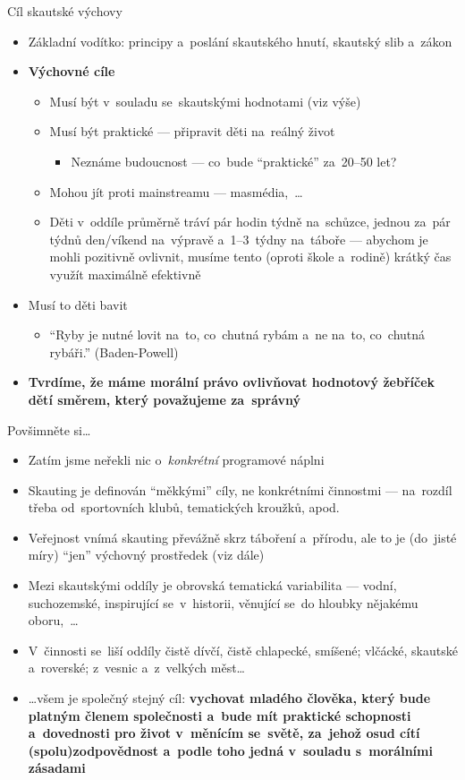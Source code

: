 \documentclass[compress, ucs, xelatex, 11pt, xcolor=dvipsnames, print, aspectratio=169,
	hyperref={
		bookmarks=true,
		unicode=true,
		colorlinks=true,
		pdftitle={Skautska vychovna metoda},
		plainpages=false,
		pdfauthor={Vojtech Zeisek},
		pdfsubject={Skautska vychovna metoda a jeji vyvoj za posledni stoleti a desetileti},
		pdfcreator={XeLaTeX},
		pdfkeywords={Junak, Pedagogika, Skaut, Skauting, Vychovna metoda},
		linkcolor=Red, %
		anchorcolor=ForestGreen, %
		citecolor=ForestGreen, %
		filecolor=ForestGreen, %
		menucolor=ForestGreen, %
		urlcolor=Sepia, %
		pdftex},
	url={hyphens, lowtilde} %
	]{beamer}
\begin{document}
\begin{frame}{Cíl skautské výchovy}
	\begin{itemize}
		\item Základní vodítko: principy a~poslání skautského hnutí, skautský slib a~zákon
		\item \textbf{Výchovné cíle}
		\begin{itemize}
			\item Musí být v~souladu se~skautskými hodnotami (viz výše)
			\item Musí být praktické --- připravit děti na~reálný život
			\begin{itemize}
		\item Neznáme budoucnost --- co~bude \enquote{praktické} za~20--50 let?
			\end{itemize}
			\item Mohou jít proti mainstreamu --- masmédia,~\ldots
			\item Děti v~oddíle průměrně tráví pár hodin týdně na~schůzce, jednou za~pár týdnů den/víkend na~výpravě a~1--3~týdny na~táboře --- abychom je mohli pozitivně ovlivnit, musíme tento (oproti škole a~rodině) krátký čas využít maximálně efektivně
		\end{itemize}
		\item Musí to děti bavit
			\begin{itemize}
		\item \enquote{Ryby je nutné lovit na~to, co~chutná rybám a~ne na~to, co~chutná rybáři.} (Baden-Powell)
			\end{itemize}
		\item \textbf{Tvrdíme, že máme morální právo ovlivňovat hodnotový žebříček dětí směrem, který považujeme za~správný}
	\end{itemize}
\end{frame}

\begin{frame}{Povšimněte si\ldots}
	\begin{itemize}
		\item Zatím jsme neřekli nic o~\textit{konkrétní} programové náplni
		\item Skauting je definován \enquote{měkkými} cíly, ne konkrétními činnostmi --- na~rozdíl třeba od~sportovních klubů, tematických kroužků, apod.
		\item Veřejnost vnímá skauting převážně skrz táboření a~přírodu, ale to je (do~jisté míry) \enquote{jen} výchovný prostředek (viz dále)
		\item Mezi skautskými oddíly je obrovská tematická variabilita --- vodní, suchozemské, inspirující se~v~historii, věnující se~do hloubky nějakému oboru,~\ldots
		\item V~činnosti se~liší oddíly čistě dívčí, čistě chlapecké, smíšené; vlčácké, skautské a~roverské; z~vesnic a~z~velkých měst\ldots
		\item \ldots všem je společný stejný \alert{cíl}: \textbf{vychovat mladého člověka, který bude platným členem společnosti a~bude mít praktické schopnosti a~dovednosti pro život v~měnícím se~světě, za~jehož osud cítí (spolu)zodpovědnost a~podle toho jedná v~souladu s~morálními zásadami}
	\end{itemize}
\end{frame}
\end{document}
